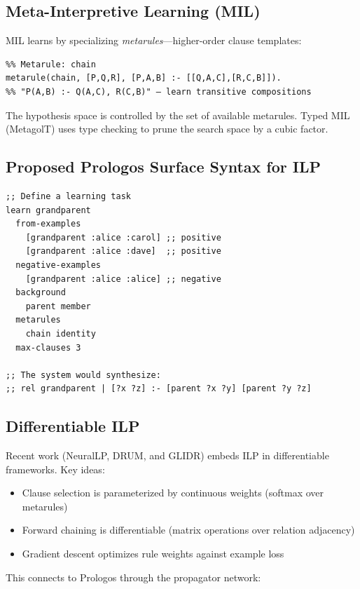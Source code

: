 \documentclass[11pt]{article}
\begin{document}
\subsection{Meta-Interpretive Learning (MIL)}
\label{sec:org94f630a}

MIL learns by specializing \emph{metarules}---higher-order clause templates:

\begin{verbatim}
%% Metarule: chain
metarule(chain, [P,Q,R], [P,A,B] :- [[Q,A,C],[R,C,B]]).
%% "P(A,B) :- Q(A,C), R(C,B)" — learn transitive compositions
\end{verbatim}

The hypothesis space is controlled by the set of available metarules.
Typed MIL (MetagolT) uses type checking to prune the search space by a
cubic factor.
\subsection{Proposed Prologos Surface Syntax for ILP}
\label{sec:orgf0fdc76}

\begin{verbatim}
;; Define a learning task
learn grandparent
  from-examples
    [grandparent :alice :carol] ;; positive
    [grandparent :alice :dave]  ;; positive
  negative-examples
    [grandparent :alice :alice] ;; negative
  background
    parent member
  metarules
    chain identity
  max-clauses 3

;; The system would synthesize:
;; rel grandparent | [?x ?z] :- [parent ?x ?y] [parent ?y ?z]
\end{verbatim}
\subsection{Differentiable ILP}
\label{sec:org295b23f}

Recent work (NeuralLP, DRUM, and GLIDR) embeds ILP in differentiable
frameworks. Key ideas:

\begin{itemize}
\item Clause selection is parameterized by continuous weights (softmax over metarules)
\item Forward chaining is differentiable (matrix operations over relation adjacency)
\item Gradient descent optimizes rule weights against example loss
\end{itemize}

This connects to Prologos through the propagator network:
\end{document}
